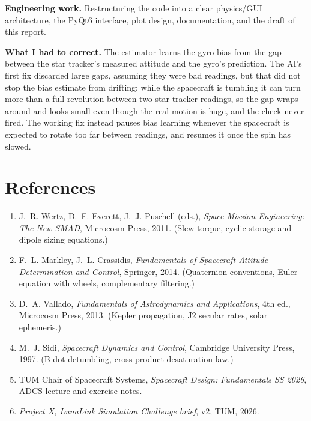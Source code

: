 \documentclass[11pt,a4paper]{article}
\begin{document}
\textbf{Engineering work.} Restructuring the code into a clear
physics/GUI architecture, the PyQt6 interface, plot design,
documentation, and the draft of this report.

\textbf{What I had to correct.} The estimator learns the gyro bias from
the gap between the star tracker's measured attitude and the gyro's
prediction. The AI's first fix discarded large gaps, assuming they were
bad readings, but that did not stop the bias estimate from drifting: while
the spacecraft is tumbling it can turn more than a full revolution between
two star-tracker readings, so the gap wraps around and looks small even
though the real motion is huge, and the check never fired. The working fix
instead pauses bias learning whenever the spacecraft is expected to rotate
too far between readings, and resumes it once the spin has slowed.

\section{References}

\begin{enumerate}\itemsep1pt
\item J.~R. Wertz, D.~F. Everett, J.~J. Puschell (eds.),
      \emph{Space Mission Engineering: The New SMAD}, Microcosm Press,
      2011. (Slew torque, cyclic storage and dipole sizing equations.)
\item F.~L. Markley, J.~L. Crassidis, \emph{Fundamentals of Spacecraft
      Attitude Determination and Control}, Springer, 2014. (Quaternion
      conventions, Euler equation with wheels, complementary filtering.)
\item D.~A. Vallado, \emph{Fundamentals of Astrodynamics and
      Applications}, 4th ed., Microcosm Press, 2013. (Kepler propagation,
      J2 secular rates, solar ephemeris.)
\item M.~J. Sidi, \emph{Spacecraft Dynamics and Control}, Cambridge
      University Press, 1997. (B-dot detumbling, cross-product
      desaturation law.)
\item TUM Chair of Spacecraft Systems, \emph{Spacecraft Design:
      Fundamentals SS 2026}, ADCS lecture and exercise notes.
\item \emph{Project X, LunaLink Simulation Challenge brief}, v2, TUM,
      2026.
\end{enumerate}
\end{document}
